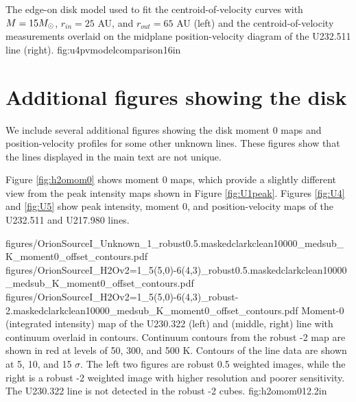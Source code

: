 \documentclass[twocolumn]{aastex61}
\begin{document}
{The edge-on disk model used to fit the centroid-of-velocity curves with
$M=15 M_{\odot}$, $r_{in}=25$ AU, and $r_{out}=65$ AU (left) and the centroid-of-velocity measurements
overlaid on the midplane position-velocity diagram of the U232.511 line (right).}
{fig:u4pvmodelcomparison}{1}{6in}

\section{Additional figures showing the disk}
\label{sec:ulinefigures}
We include several additional figures showing the disk moment 0 maps and
position-velocity profiles for some other unknown lines.  These figures show
that the lines displayed in the main text are not unique.

Figure \ref{fig:h2omom0} shows moment 0 maps, which provide a slightly
different view from the peak intensity maps shown in Figure \ref{fig:U1peak}.
Figures \ref{fig:U4} and \ref{fig:U5} show peak intensity, moment 0, and
position-velocity maps of the U232.511 and U217.980 lines.

\FigureThree
{{figures/OrionSourceI_Unknown_1_robust0.5.maskedclarkclean10000_medsub_K_moment0_offset_contours}.pdf}
{{figures/OrionSourceI_H2Ov2=1_5(5,0)-6(4,3)_robust0.5.maskedclarkclean10000_medsub_K_moment0_offset_contours}.pdf}
{{figures/OrionSourceI_H2Ov2=1_5(5,0)-6(4,3)_robust-2.maskedclarkclean10000_medsub_K_moment0_offset_contours}.pdf}
{Moment-0 (integrated intensity) map of the U230.322 (left) and \water (middle,
right) line with continuum overlaid in contours.  Continuum contours
from the robust -2 map are shown
in red at levels of 
50,  300, and 500 K.
Contours of the line data are shown at 5, 10, and 15 $\sigma$.
The left two figures are robust 0.5 weighted images, while the right
is a robust -2 weighted image with higher resolution and poorer
sensitivity.  The U230.322 line is not detected in the robust -2 cubes.
}
{fig:h2omom0}{1}{2.2in}
\end{document}
